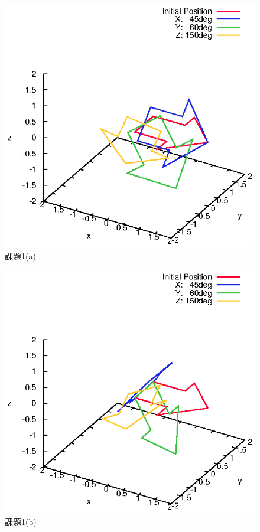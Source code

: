 \documentclass[a4paper,10pt]{jsarticle}
\begin{document}
\begin{figure}[htb]
  \begin{center}
    \includegraphics[clip,width=14cm]{fig/eps/1(a).eps}
  \end{center}
  \caption{課題1(a)}
  \label{fig:課題1(a)}
\end{figure}

\begin{figure}[htb]
  \begin{center}
    \includegraphics[clip,width=14cm]{fig/eps/1(b).eps}
  \end{center}
  \caption{課題1(b)}
  \label{fig:課題1(b)}
\end{figure}
\end{document}
